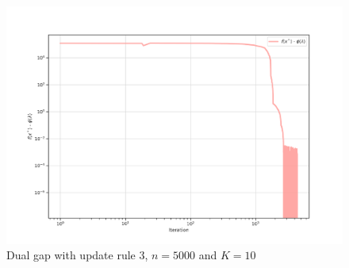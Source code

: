 \documentclass[notitlepage]{article}
\begin{document}
\vfill
\hspace{0pt}

\newpage

\vfill
\hspace{0pt}

\begin{minipage}{.7\textwidth}
  \begin{figure}[H]
    \centering
    \includegraphics[scale=0.5]{pics/n=5000_K=10_gap_rule=3.png}
    \caption{Dual gap with update rule $3$, $n=5000$ and $K=10$}
    \label{fig:rule-3-n-5000-k-10-gap}
  \end{figure}
\end{minipage}
\begin{minipage}{.3\textwidth}
  \begin{table}[H]
    \centering
    \caption{\centering Sum up table for $n=5000$, $K=10$ and rule $3$}
    \label{tab:n-5000-K-10-rule-3}
  \end{table}
\end{minipage}
\end{document}
